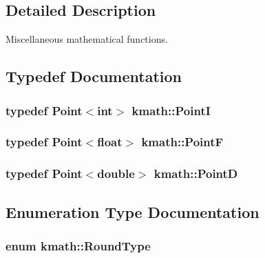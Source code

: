 \subsection{Detailed Description}
Miscellaneous mathematical functions. 

\subsection{Typedef Documentation}
\hypertarget{namespacekmath_afaf3fde3b20c9932e144eb48e736cad9}{
\subsubsection[{Point\-I}]{\setlength{\rightskip}{0pt plus 5cm}typedef {\bf Point}$<$int$>$ {\bf kmath\-::\-Point\-I}}}\label{namespacekmath_afaf3fde3b20c9932e144eb48e736cad9}
\hypertarget{namespacekmath_ad80aa80b21a1aeadbd484a0fc56f4e95}{
\subsubsection[{Point\-F}]{\setlength{\rightskip}{0pt plus 5cm}typedef {\bf Point}$<$float$>$ {\bf kmath\-::\-Point\-F}}}\label{namespacekmath_ad80aa80b21a1aeadbd484a0fc56f4e95}
\hypertarget{namespacekmath_aad2e627ee7da1b98c2c516f20ed5b7e3}{
\subsubsection[{Point\-D}]{\setlength{\rightskip}{0pt plus 5cm}typedef {\bf Point}$<$double$>$ {\bf kmath\-::\-Point\-D}}}\label{namespacekmath_aad2e627ee7da1b98c2c516f20ed5b7e3}


\subsection{Enumeration Type Documentation}
\hypertarget{namespacekmath_a1e00ae34fe8ed9548870fc759ea82609}{
\subsubsection[{Round\-Type}]{\setlength{\rightskip}{0pt plus 5cm}enum {\bf kmath\-::\-Round\-Type}}}\label{namespacekmath_a1e00ae34fe8ed9548870fc759ea82609}


